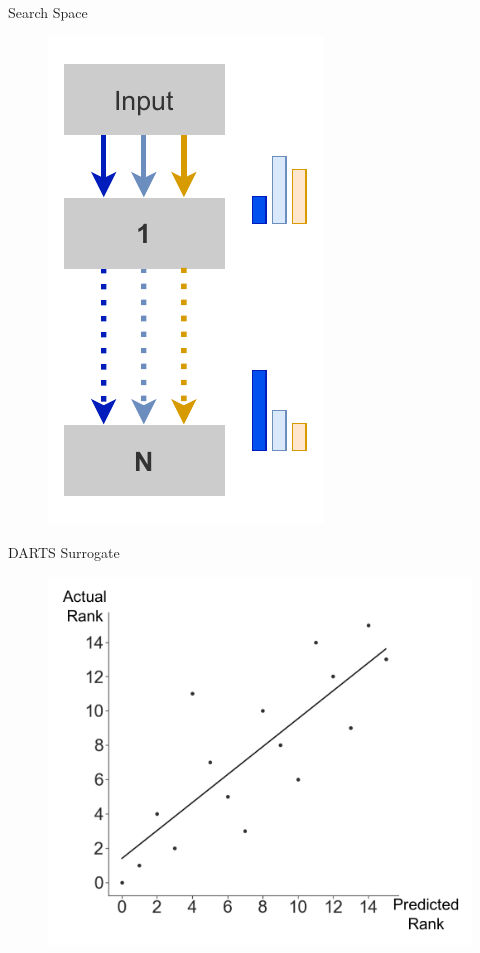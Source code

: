 \documentclass[]{beamer}
\begin{document}
\begin{frame}{Search Space}
\vspace{14pt}
\vfill
\begin{figure}
    \begin{center}
    \includegraphics[scale=.8]{graphics/quick/search_space_incl_sampling_prob.drawio.pdf}
  \end{center} 
\end{figure}
\end{frame}

\begin{frame}{DARTS Surrogate}
\vspace{10pt}
\vfill
\begin{figure}
    \includegraphics[scale=0.5, center]{graphics/spearman_validation.pdf}
\end{figure}
\end{frame}
\end{document}
